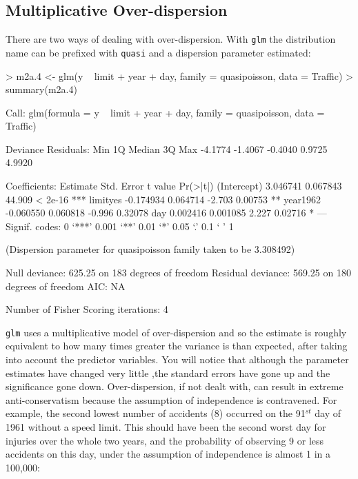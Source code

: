 \documentclass{article}
\begin{document}
\subsection{Multiplicative Over-dispersion}

There are two ways of dealing with over-dispersion. With \texttt{glm} the distribution name can be prefixed with \texttt{quasi} and a dispersion parameter estimated:

\begin{Schunk}
\begin{Sinput}
> m2a.4 <- glm(y ~ limit + year + day, family = quasipoisson, data = Traffic)
> summary(m2a.4)
\end{Sinput}
\begin{Soutput}
Call:
glm(formula = y ~ limit + year + day, family = quasipoisson, 
    data = Traffic)

Deviance Residuals: 
    Min       1Q   Median       3Q      Max  
-4.1774  -1.4067  -0.4040   0.9725   4.9920  

Coefficients:
             Estimate Std. Error t value Pr(>|t|)    
(Intercept)  3.046741   0.067843  44.909  < 2e-16 ***
limityes    -0.174934   0.064714  -2.703  0.00753 ** 
year1962    -0.060550   0.060818  -0.996  0.32078    
day          0.002416   0.001085   2.227  0.02716 *  
---
Signif. codes:  0 `***' 0.001 `**' 0.01 `*' 0.05 `.' 0.1 ` ' 1 

(Dispersion parameter for quasipoisson family taken to be 3.308492)

    Null deviance: 625.25  on 183  degrees of freedom
Residual deviance: 569.25  on 180  degrees of freedom
AIC: NA

Number of Fisher Scoring iterations: 4
\end{Soutput}
\end{Schunk}

\texttt{glm} uses a multiplicative model of over-dispersion and so the estimate is roughly equivalent to how many times greater the variance is than expected, after taking into account the predictor variables. You will notice that although the parameter estimates have changed very little ,the standard errors have gone up and the significance gone down. Over-dispersion, if not dealt with, can result in extreme anti-conservatism because the assumption of independence is contravened. For example, the second lowest number of accidents (8) occurred on the 91$^{st}$ day of 1961 without a speed limit. This should have been the second worst day for injuries over the whole two years, and the probability of observing 9 or less accidents on this day, under the assumption of independence is almost 1 in a 100,000:
\end{document}
